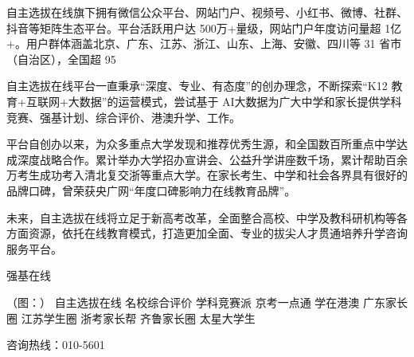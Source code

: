 自主选拔在线旗下拥有微信公众平台、网站门户、视频号、小红书、微博、社群、抖音等矩阵生态平台。平台活跃用户达 500万+量级，网站门户年度访问量超 1亿+。用户群体涵盖北京、广东、江苏、浙江、山东、上海、安徽、四川等 31 省市（自治区），全国超 95%

自主选拔在线平台一直秉承“深度、专业、有态度”的创办理念，不断探索“K12 教育+互联网+大数据”的运营模式，尝试基于 AI大数据为广大中学和家长提供学科竞赛、强基计划、综合评价、港澳升学、工作。

平台自创办以来，为众多重点大学发现和推荐优秀生源，和全国数百所重点中学达成深度战略合作。累计举办大学招办宣讲会、公益升学讲座数千场，累计帮助百余万考生成功考入清北复交浙等重点大学。在家长考生、中学和社会各界具有很好的品牌口碑，曾荣获央广网“年度口碑影响力在线教育品牌”。

未来，自主选拔在线将立足于新高考改革，全面整合高校、中学及教科研机构等各方面资源，依托在线教育模式，打造更加全面、专业的拔尖人才贯通培养升学咨询服务平台。

强基在线

（图：）
自主选拔在线
名校综合评价
学科竞赛派
京考一点通
学在港澳
广东家长圈
江苏学生圈
浙考家长帮
齐鲁家长圈
太星大学生

咨询热线：010-5601
